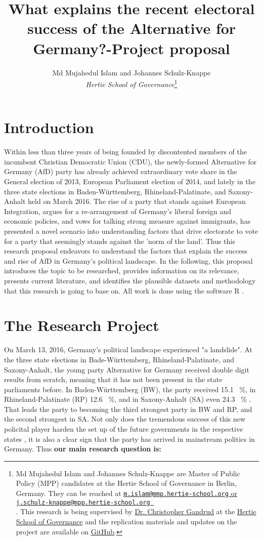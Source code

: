 \documentclass[12pt, hidelinks]{article}
\title{What explains the recent electoral success of the Alternative for Germany?-Project proposal}
\author{Md Mujahedul Islam and Johannes Schulz-Knappe\\ \emph{Hertie School of Governance}\footnote{Md Mujahedul Islam and Johannes Schulz-Knappe are Master of Public Policy (MPP) candidates at the Hertie School of Governance in Berlin, Germany. They can be reached at
\href{mailto:m.islam@mmp.hertie-school.org}{\nolinkurl{m.islam@mmp.hertie-school.org} or \href{mailto:j.schulz-knappe@mpp.hertie-school.org 
}{\nolinkurl{j.schulz-knappe@mpp.hertie-school.org 
}}}. This research is being supervised by \href{https://github.com/christophergandrud} {Dr. Christopher Gandrud} at the \href{https://www.hertie-school.org/} {Hertie School of Governance} and the replication materials and updates on the project are available on \href{https://github.com/JohannesSchulz-Knappe/Assignment02} {GitHub}.}}
\begin{document}
\maketitle

\section{Introduction}
Within less than three years of being founded by discontented members of the incumbent Christian Democratic Union (CDU), the newly-formed Alternative for Germany (AfD) party has already achieved extraordinary vote share in the General election of 2013, European Parliament election of 2014, \cite{arzheimer2015afd} and  lately in the three state elections in Baden-Württemberg, Rhineland-Palatinate, and Saxony-Anhalt held on March 2016. The rise of a party that stands against European Integration, argues for a re-arrangement of Germany's liberal foreign and economic policies, and vows for talking strong measure against immigrants, has presented a novel scenario into understanding factors that drive electorate to vote for a party that seemingly stands against the 'norm of the land'. Thus this research proposal endeavors to understand the factors that explain the success and rise of AfD in Germany's political landscape. In the following, this proposal introduces the topic to be researched, provides information on its relevance, presents current literature, and identifies the plausible datasets and methodology that this research is going to base on. All work is done using the software R \cite{CiteR}.

\section{The Research Project}

On March 13, 2016, Germany's political landscape experienced "a landslide"\cite{Zeit2016}. At the three state elections in Bade-Württemberg, Rhineland-Palatinate, and Saxony-Anhalt, the young party Alternative for Germany received double digit results from scratch, meaning that it has not been present in the state parliaments before. In Baden-Württemberg (BW), the party received 15.1 \ \%, in Rhineland-Palatinate (RP) 12.6 \ \%, and in Saxony-Anhalt (SA) even 24.3 \ \% \cite{BWStateOffice, RPStateOffice, SAStateOffice}. That leads the party to becoming the third strongest party in BW and RP, and the second strongest in SA.
Not only does the tremendous success of this new policital player harden the set up of the future governments in the respective states \cite{Spiegel2016}, it is also a clear sign that the party has arrived in mainstream politics in Germany. Thus \textbf{our main research question is:}
\end{document}
